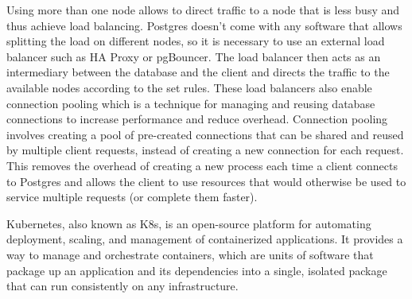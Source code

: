 Using more than one node allows to direct traffic to a node that is less busy and thus achieve load balancing. Postgres doesn't come with any software that allows splitting the load on different nodes, so it is necessary to use an external load balancer such as HA Proxy or pgBouncer. The load balancer then acts as an intermediary between the database and the client and directs the traffic to the available nodes according to the set rules. These load balancers also enable connection pooling which is a technique for managing and reusing database connections to increase performance and reduce overhead. Connection pooling involves creating a pool of pre-created connections that can be shared and reused by multiple client requests, instead of creating a new connection for each request. This removes the overhead of creating a new process each time a client connects to Postgres and allows the client to use resources that would otherwise be used to service multiple requests (or complete them faster). \cite{PerconaBlogConnectionPooling}

\label{chap:kubernetes}
Kubernetes, also known as K8s, is an open-source platform for automating deployment, scaling, and management of containerized applications. It provides a way to manage and orchestrate containers, which are units of software that package up an application and its dependencies into a single, isolated package that can run consistently on any infrastructure. \cite{vayghan2019Kubernetes}

